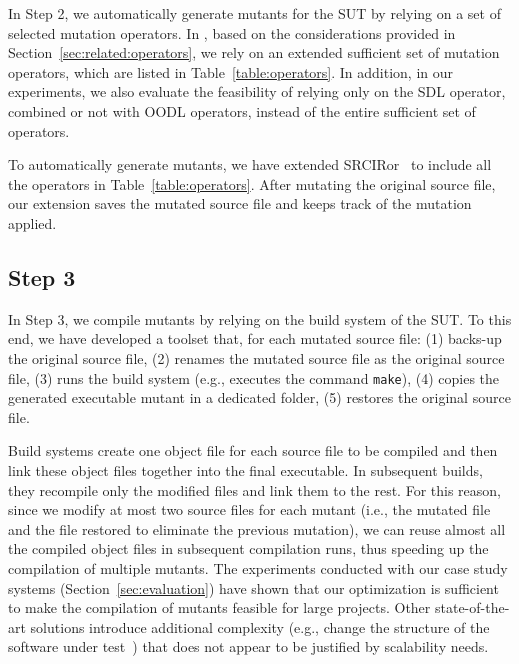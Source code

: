 In Step 2, we automatically generate mutants for the SUT by relying on a set of selected mutation operators.
In \APPR, based on the considerations provided in Section~\ref{sec:related:operators}, we rely on an extended sufficient set of mutation operators, which are listed in Table~\ref{table:operators}.
In addition, in our experiments, we also evaluate the feasibility of relying only on the SDL operator, combined or not with OODL operators, instead of the entire sufficient set of operators.



To automatically generate mutants, we have extended SRCIRor~\cite{hariri2018srciror} to include all the 
operators in Table~\ref{table:operators}.
After mutating the original source file, our extension saves the mutated source file and keeps track of the mutation applied. 

\subsection{Step 3}
\label{sec:appr:compile}

In Step 3, we compile mutants by relying on the build system of the SUT. To this end, we have developed a toolset that, for each mutated source file: (1) backs-up the original source file, (2) renames the mutated source file as the original source file, (3) runs the build system (e.g., executes the command \texttt{make}), (4) copies the generated executable mutant in a dedicated folder, (5) restores the original source file. 

Build systems create one object file for each source file to be compiled and then link these object files together into the final executable. 
 {In subsequent builds, they recompile only the modified files and link them to the rest.}
For this reason, since we modify at most two source files for each mutant (i.e., the mutated file and the file restored to eliminate the previous mutation), we can reuse almost all the compiled object files in subsequent compilation runs, thus speeding up the compilation of multiple mutants. The experiments conducted with our case study systems (Section~\ref{sec:evaluation}) have shown that 
 {our optimization is sufficient to make the compilation of mutants feasible for large projects. Other state-of-the-art solutions introduce additional complexity (e.g., change the structure of the software under test~\cite{untch1993mutation}) that does not appear to be justified by scalability needs.}

